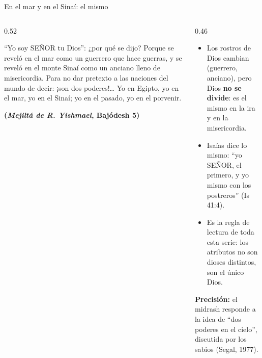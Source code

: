 \documentclass[hyperref={bookmarks=false},aspectratio=169]{beamer}
\newcommand{\SENOR}{S{\fontsize{0.78em}{1em}\selectfont EÑOR}}
\newcommand{\fuente}[1]{\par\hfill{\upshape\bfseries\footnotesize\textcolor{azul}{#1}}}
\newcommand{\destacar}[1]{\textbf{\textcolor{azul}{#1}}}
\newcommand{\precision}[1]{{\footnotesize\color{gris}\textbf{Precisión:} #1}}
\begin{document}
\begin{frame}{En el mar y en el Sinaí: el mismo}
\begin{columns}[t,onlytextwidth]
\begin{column}{0.52\textwidth}
\begin{cita}[colback=dorado!10!papiro,colframe=dorado!80!azul,fontupper=\scriptsize\itshape]``Yo soy \SENOR{} tu Dios'': ¿por qué se dijo? Porque se reveló en el mar como un guerrero que hace guerras, y se reveló en el monte Sinaí como un anciano lleno de misericordia. Para no dar pretexto a las naciones del mundo de decir: ¡son dos poderes!\ldots{} Yo en Egipto, yo en el mar, yo en el Sinaí; yo en el pasado, yo en el porvenir.\fuente{(\emph{Mejiltá de R. Yishmael}, Bajódesh 5)}\end{cita}
\end{column}
\begin{column}{0.46\textwidth}\small
\begin{itemize}
\item Los rostros de Dios cambian (guerrero, anciano), pero Dios \destacar{no se divide}: es el mismo en la ira y en la misericordia.
\item Isaías dice lo mismo: ``yo \SENOR, el primero, y yo mismo con los postreros'' (Is 41:4).
\item Es la regla de lectura de toda esta serie: los atributos no son dioses distintos, son el único Dios.
\end{itemize}
\precision{el midrash responde a la idea de ``dos poderes en el cielo'', discutida por los sabios (Segal, 1977).}
\end{column}
\end{columns}
\end{frame}
\end{document}
